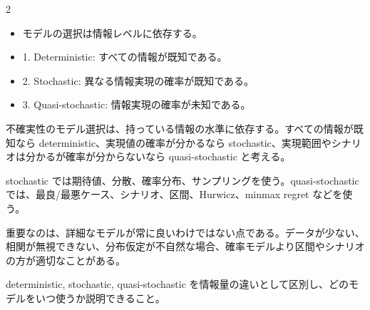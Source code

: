\clearpage



\vspace{1.5mm}

\begin{multicols}{2}

\footnotesize

\raggedcolumns


\begin{itemize}
\item モデルの選択は情報レベルに依存する。
\item 1. Deterministic: すべての情報が既知である。
\item 2. Stochastic: 異なる情報実現の確率が既知である。
\item 3. Quasi-stochastic: 情報実現の確率が未知である。
\end{itemize}

不確実性のモデル選択は、持っている情報の水準に依存する。すべての情報が既知なら deterministic、実現値の確率が分かるなら stochastic、実現範囲やシナリオは分かるが確率が分からないなら quasi-stochastic と考える。\par

stochastic では期待値、分散、確率分布、サンプリングを使う。quasi-stochastic では、最良/最悪ケース、シナリオ、区間、Hurwicz、minmax regret などを使う。\par

重要なのは、詳細なモデルが常に良いわけではない点である。データが少ない、相関が無視できない、分布仮定が不自然な場合、確率モデルより区間やシナリオの方が適切なことがある。\par

deterministic, stochastic, quasi-stochastic を情報量の違いとして区別し、どのモデルをいつ使うか説明できること。\par


\end{multicols}
